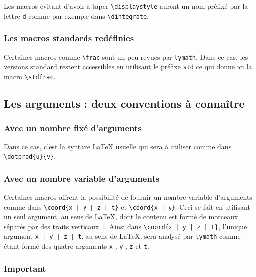 \documentclass[12pt,a4paper]{article}
\newcommand\env[1]{\texttt{#1}}
\newcommand\macro[1]{\env{\textbackslash{}#1}}
\theoremstyle{definition}
\newcommand\prefix[1]{%
	\texttt{#1}%
}
\begin{document}
Les macros évitant d'avoir à taper \macro{displaystyle} auront un nom préfixé par la lettre \prefix{d} comme par exemple dans \macro{dintegrate}.




\subsubsection{Les macros standards redéfinies}

Certaines macros comme \verb+\frac+ sont un peu revues par \verb+lymath+.
Dans ce cas, les versions standard restent accessibles en utilisant le préfixe \prefix{std} ce qui donne ici la macro \macro{stdfrac}.




\subsection{Les arguments : deux conventions à connaître}

\subsubsection{Avec un nombre fixé d'arguments}

Dans ce cas, c'est la syntaxe \LaTeX{} usuelle qui sera à utiliser comme dans \macro{dotprod\{u\}\{v\}}.




\subsubsection{Avec un nombre variable d'arguments}

Certaines macros offrent la possibilité de fournir un nombre variable d'arguments comme dans \macro{coord\{x | y | z | t\}} et \macro{coord\{x | y\}}.
Ceci se fait en utilisant un seul argument, au sens de \LaTeX{}, dont le contenu est formé de morceaux séparés par des traits verticaux \verb+|+.
Ainsi dans \macro{coord\{x | y | z | t\}}, l'unique argument \verb+x | y | z | t+, au sens de \LaTeX{}, sera analysé par \verb+lymath+ comme étant formé des quatre arguments \verb+x+ , \verb+y+ , \verb+z+ et \verb+t+.




\subsubsection{Important}
\end{document}
